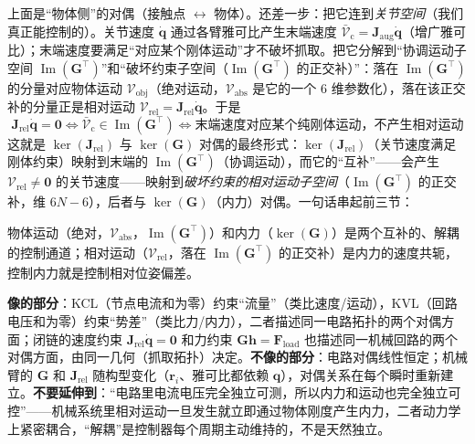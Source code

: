 上面是“物体侧”的对偶（接触点 $\leftrightarrow$ 物体）。还差一步：把它连到\emph{关节空间}（我们真正能控制的）。关节速度 $\dot{\mathbf{q}}$ 通过各臂雅可比产生末端速度 $\bar{\boldsymbol{\mathcal{V}}}_{\text{c}}=\mathbf{J}_{\text{aug}}\dot{\mathbf{q}}$（增广雅可比）；末端速度要满足“对应某个刚体运动”才不破坏抓取。把它分解到“协调运动子空间 $\operatorname{Im}(\mathbf{G}^\top)$”和“破坏约束子空间（$\operatorname{Im}(\mathbf{G}^\top)$ 的正交补）”：落在 $\operatorname{Im}(\mathbf{G}^\top)$ 的分量对应物体运动 $\boldsymbol{\mathcal{V}}_{\text{obj}}$（绝对运动，$\boldsymbol{\mathcal{V}}_{\text{abs}}$ 是它的一个 $6$ 维参数化），落在该正交补的分量正是相对运动 $\boldsymbol{\mathcal{V}}_{\text{rel}}=\mathbf{J}_{\text{rel}}\dot{\mathbf{q}}$。于是
\begin{equation}
  \boxed{\;\mathbf{J}_{\text{rel}}\dot{\mathbf{q}}=\mathbf{0}
  \iff \bar{\boldsymbol{\mathcal{V}}}_{\text{c}}\in\operatorname{Im}(\mathbf{G}^\top)
  \iff \text{末端速度对应某个纯刚体运动，不产生相对运动}\;}
  \label{eq:ma-final-equiv}
\end{equation}
这就是 $\ker(\mathbf{J}_{\text{rel}})$ 与 $\ker(\mathbf{G})$ 对偶的最终形式：$\ker(\mathbf{J}_{\text{rel}})$（关节速度满足刚体约束）映射到末端的 $\operatorname{Im}(\mathbf{G}^\top)$（协调运动），而它的“互补”——会产生 $\boldsymbol{\mathcal{V}}_{\text{rel}}\neq\mathbf{0}$ 的关节速度——映射到\emph{破坏约束的相对运动子空间}（$\operatorname{Im}(\mathbf{G}^\top)$ 的正交补，维 $6N-6$），后者与 $\ker(\mathbf{G})$（内力）对偶。一句话串起前三节：

\begin{insight}[一句话串起前三节]
物体运动（绝对，$\boldsymbol{\mathcal{V}}_{\text{abs}}$，$\operatorname{Im}(\mathbf{G}^\top)$）和内力（$\ker(\mathbf{G})$）是两个互补的、解耦的控制通道；相对运动（$\boldsymbol{\mathcal{V}}_{\text{rel}}$，落在 $\operatorname{Im}(\mathbf{G}^\top)$ 的正交补）是内力的速度共轭，控制内力就是控制相对位姿偏差。
\end{insight}

\begin{insight}
\textbf{像的部分}：KCL（节点电流和为零）约束“流量”（类比速度/运动），KVL（回路电压和为零）约束“势差”（类比力/内力），二者描述同一电路拓扑的两个对偶方面；闭链的速度约束 $\mathbf{J}_{\text{rel}}\dot{\mathbf{q}}=\mathbf{0}$ 和力约束 $\mathbf{G}\mathbf{h}=\mathbf{F}_{\text{load}}$ 也描述同一机械回路的两个对偶方面，由同一几何（抓取拓扑）决定。\textbf{不像的部分}：电路对偶线性恒定；机械臂的 $\mathbf{G}$ 和 $\mathbf{J}_{\text{rel}}$ 随构型变化（$\mathbf{r}_i$、雅可比都依赖 $\mathbf{q}$），对偶关系在每个瞬时重新建立。\textbf{不要延伸到}：“电路里电流电压完全独立可测，所以内力和运动也完全独立可控”——机械系统里相对运动一旦发生就立即通过物体刚度产生内力，二者动力学上紧密耦合，“解耦”是控制器每个周期主动维持的，不是天然独立。
\end{insight}

